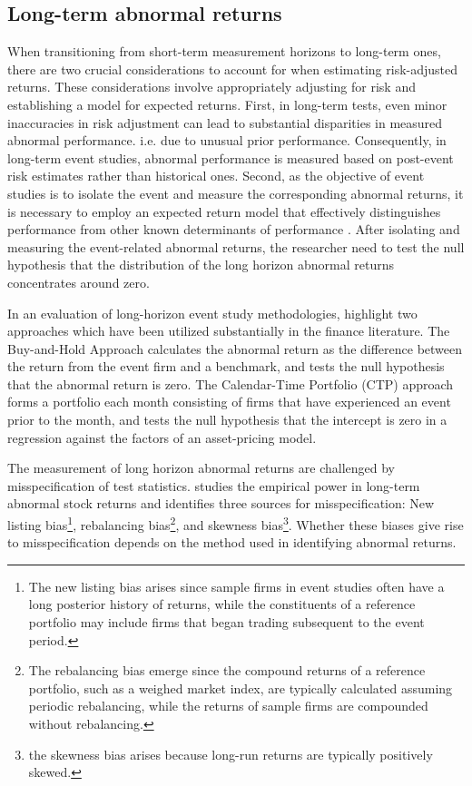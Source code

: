  

\subsection{Long-term abnormal returns}

When transitioning from short-term measurement horizons to long-term ones, there are two crucial considerations to account for when estimating risk-adjusted returns. These considerations involve appropriately adjusting for risk and establishing a model for expected returns. First, in long-term tests, even minor inaccuracies in risk adjustment can lead to substantial disparities in measured abnormal performance. i.e. due to unusual prior performance. Consequently, in long-term event studies, abnormal performance is measured based on post-event risk estimates rather than historical ones. Second, as the objective of event studies is to isolate the event and measure the corresponding abnormal returns, it is necessary to employ an expected return model that effectively distinguishes performance from other known determinants of performance \cite{kothari}. After isolating and measuring the event-related abnormal returns, the researcher need to test the null hypothesis that the distribution of the long horizon abnormal returns concentrates around zero.   

In an evaluation of long-horizon event study methodologies, \cite{Ang_event_method} highlight two approaches which have been utilized substantially in the finance literature. The Buy-and-Hold Approach calculates the abnormal return as the difference between the return from the event firm and a benchmark, and tests the null hypothesis that the abnormal return is zero. The Calendar-Time Portfolio (CTP) approach forms a portfolio each month consisting of firms that have experienced an event prior to the month, and tests the null hypothesis that the intercept is zero in a regression against the factors of an asset-pricing model.

The measurement of long horizon abnormal returns are challenged by misspecification of test statistics. \cite{Lyon_1997_test_stats} studies the empirical power in long-term abnormal stock returns and identifies three sources for misspecification: New listing bias\footnote{The new listing bias arises since sample firms in event studies often have a long posterior history of returns, while the constituents of a reference portfolio may include firms that began trading subsequent to the event period.}, rebalancing bias\footnote{The rebalancing bias emerge since the compound returns of a reference portfolio, such as a weighed market index, are typically calculated assuming periodic rebalancing, while the returns of sample firms are compounded without rebalancing. }, and skewness bias\footnote{ the skewness bias arises because long-run returns are typically positively skewed.}. Whether these biases give rise to misspecification depends on the method used in identifying abnormal returns. 

